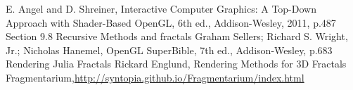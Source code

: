 \documentclass[a4paper]{article}
\begin{document}
\begin{thebibliography}{1}
E. Angel and D. Shreiner, Interactive Computer Graphics: A Top-Down Approach with Shader-Based OpenGL, 6th ed., Addison-Wesley, 2011, p.487 Section 9.8 Recursive Methods and fractals
Graham Sellers; Richard S. Wright, Jr.; Nicholas Hanemel, OpenGL SuperBible, 7th ed., Addison-Wesley, p.683 Rendering Julia Fractals
Rickard Englund, Rendering Methods for 3D Fractals
Fragmentarium,\url{http://syntopia.github.io/Fragmentarium/index.html}
\end{thebibliography}
\end{document}
